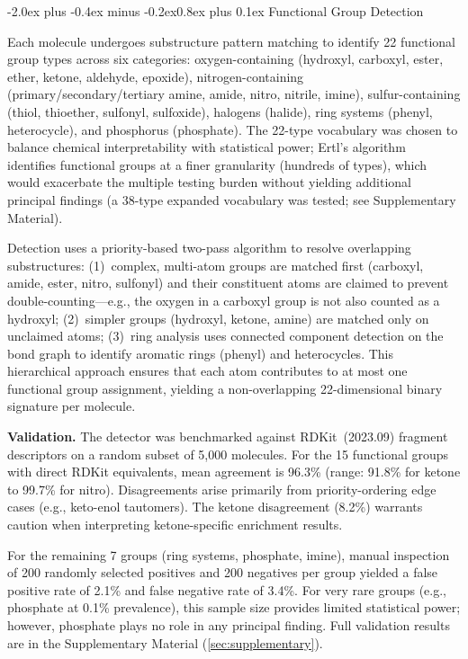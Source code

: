 \documentclass[10pt,a4paper,twocolumn]{article}
\makeatletter
\renewcommand\subsection{\@startsection{subsection}{2}{\z@}%
  {-2.0ex plus -0.4ex minus -0.2ex}{0.8ex plus 0.1ex}%
  {\normalfont\large\bfseries}}
\makeatother
\begin{document}
\subsection{Functional Group Detection}

Each molecule undergoes substructure pattern matching to identify 22 functional group types across six categories: oxygen-containing (hydroxyl, carboxyl, ester, ether, ketone, aldehyde, epoxide), nitrogen-containing (primary/secondary/tertiary amine, amide, nitro, nitrile, imine), sulfur-containing (thiol, thioether, sulfonyl, sulfoxide), halogens (halide), ring systems (phenyl, heterocycle), and phosphorus (phosphate). The 22-type vocabulary was chosen to balance chemical interpretability with statistical power; Ertl's algorithm~\cite{ertl2017} identifies functional groups at a finer granularity (hundreds of types), which would exacerbate the multiple testing burden without yielding additional principal findings (a 38-type expanded vocabulary was tested; see Supplementary Material).

Detection uses a priority-based two-pass algorithm to resolve overlapping substructures: (1)~complex, multi-atom groups are matched first (carboxyl, amide, ester, nitro, sulfonyl) and their constituent atoms are claimed to prevent double-counting---e.g., the oxygen in a carboxyl group is not also counted as a hydroxyl; (2)~simpler groups (hydroxyl, ketone, amine) are matched only on unclaimed atoms; (3)~ring analysis uses connected component detection on the bond graph to identify aromatic rings (phenyl) and heterocycles. This hierarchical approach ensures that each atom contributes to at most one functional group assignment, yielding a non-overlapping 22-dimensional binary signature per molecule.

\textbf{Validation.} The detector was benchmarked against RDKit~(2023.09) fragment descriptors on a random subset of 5,000 molecules. For the 15 functional groups with direct RDKit equivalents, mean agreement is 96.3\% (range: 91.8\% for ketone to 99.7\% for nitro). Disagreements arise primarily from priority-ordering edge cases (e.g., keto-enol tautomers). The ketone disagreement (8.2\%) warrants caution when interpreting ketone-specific enrichment results.

For the remaining 7 groups (ring systems, phosphate, imine), manual inspection of 200 randomly selected positives and 200 negatives per group yielded a false positive rate of 2.1\% and false negative rate of 3.4\%. For very rare groups (e.g., phosphate at 0.1\% prevalence), this sample size provides limited statistical power; however, phosphate plays no role in any principal finding. Full validation results are in the Supplementary Material (\cref{sec:supplementary}).
\end{document}
